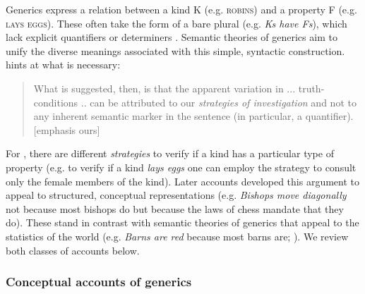 \documentclass[12pt,letterpaper]{article}
\begin{document}
Generics express a relation between a kind K (e.g. \textsc{robins}) and a property F (e.g. \textsc{lays eggs}). 
These often take the form of a bare plural (e.g. \emph{Ks have Fs}), which lack explicit quantifiers or determiners \cite{Carlson1977}.
Semantic theories of generics aim to unify the diverse meanings associated with this simple, syntactic construction. 
 hints at what is necessary:
%
\begin{quote}
What is suggested, then, is that the apparent variation in ... truth-conditions .. can be attributed to our \emph{strategies of investigation} and not to any inherent semantic marker in the sentence (in particular, a quantifier). [emphasis ours]
\end{quote}
%
For \citeauthor{Carlson1977}, there are different \emph{strategies} to verify if a kind has a particular type of property 
(e.g. to verify if a kind \emph{lays eggs} one can employ the strategy to consult only the female members of the kind). 
Later accounts developed this argument to appeal to structured, conceptual representations (e.g. \emph{Bishops move diagonally} not because most bishops do but because the laws of chess mandate that they do). 
These stand in contrast with semantic theories of generics that appeal to the statistics of the world (e.g. \emph{Barns are red} because most barns are; ).
We review both classes of accounts below.
\subsubsection*{Conceptual accounts of generics}
\end{document}
